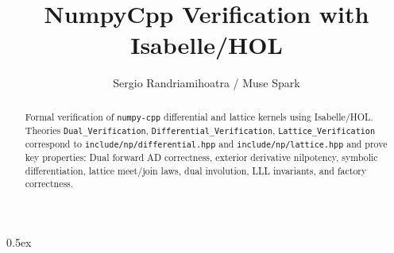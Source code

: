 \documentclass[11pt,a4paper]{article}
\begin{document}
\title{NumpyCpp Verification with Isabelle/HOL}
\author{Sergio Randriamihoatra / Muse Spark}
\maketitle
\begin{abstract}
Formal verification of \texttt{numpy-cpp} differential and lattice kernels
using Isabelle/HOL. Theories \texttt{Dual\_Verification}, \texttt{Differential\_Verification},
\texttt{Lattice\_Verification} correspond to \texttt{include/np/differential.hpp}
and \texttt{include/np/lattice.hpp} and prove key properties: Dual forward AD
correctness, exterior derivative nilpotency, symbolic differentiation, lattice
meet/join laws, dual involution, LLL invariants, and factory correctness.
\end{abstract}
\tableofcontents
\parindent 0pt \parskip 0.5ex

\end{document}
